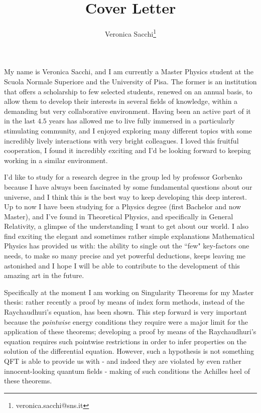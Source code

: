 \documentclass[12pt, a4paper]{article}
\title{Cover Letter}
\author{Veronica Sacchi\thanks{veronica.sacchi@sns.it}}
\begin{document}
\maketitle

My name is Veronica Sacchi, and I am currently a Master Physics student at the Scuola Normale Superiore and the University of Pisa. The former is an institution that offers a scholarship to few selected students, renewed on an annual basis, to allow them to develop their interests in several fields of knowledge, within a demanding but very collaborative environment.
Having been an active part of it in the last \(4.5\) years has allowed me to live fully immersed in a particularly stimulating community, and I enjoyed exploring many different topics with some incredibly lively interactions with very bright colleagues. I loved this fruitful cooperation, I found it incredibly exciting and I'd be looking forward to keeping working in a similar environment.

I'd like to study for a research degree in the group led by professor Gorbenko because I have always been fascinated by some fundamental questions about our universe, and I think this is the best way to keep developing this deep interest.
Up to now I have been studying for a Physics degree (first Bachelor and now Master), and I've found in Theoretical Physics, and specifically in General Relativity, a glimpse of the understanding I want to get about our world. 
I also find exciting the elegant and sometimes rather simple explanations Mathematical Physics has provided us with: the ability to single out the ``few" key-factors one needs, to make so many precise and yet powerful deductions, keeps leaving me astonished and I hope I will be able to contribute to the development of this amazing art in the future.

Specifically at the moment I am working on Singularity Theorems for my Master thesis: rather recently a proof by means of index form methods, instead of the Raychaudhuri's equation, has been shown. This step forward is very important because the \emph{pointwise} energy conditions they require were a major limit for the application of these theorems; developing a proof by means of the Raychaudhuri's equation requires such pointwise restrictions in order to infer properties on the solution of the differential equation. However, such a hypothesis is not something QFT is able to provide us with - and indeed they are violated by even rather innocent-looking quantum fields - making of such conditions the Achilles heel of these theorems.
\end{document}

